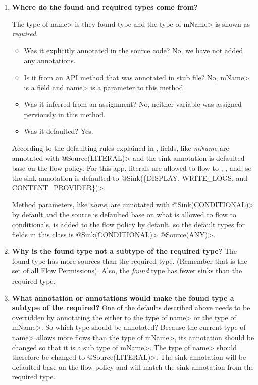 \begin{enumerate}

\item \textbf{Where do the found  and required types come from?}

The type of \<name> is they found type and the type of \<mName> is
shown as \emph{required}.  

 \begin{itemize}
    \item Was it explicitly annotated in the source code? No, we have not added 
    any annotations.
    \item Is it from an API method that was annotated in stub file? No, \<mName> 
    is a field and \<name> is a parameter to this method.
    \item Was it inferred from an assignment? No, neither variable was assigned 
    perviously in this method. 
    \item Was it defaulted? Yes.
    \end{itemize}

 According to the defaulting rules explained in , fields, like \emph{mName} 
 are annotated with \<@Source(LITERAL)> and the sink annotation is defaulted base on the  
 flow policy.  For this app, literals are allowed to flow to , 
 , and, so the sink annotation is 
 defaulted to \<@Sink(\{DISPLAY, WRITE\_LOGS, and CONTENT\_PROVIDER\})>.
 
 Method parameters, like \emph{name}, are annotated with \<@Sink(CONDITIONAL)> by 
 default and the source is defaulted base on what is allowed to flow to conditionals.
    is added to the flow policy by default, so the default types
    for fields in this class is \<@Sink(CONDITIONAL)> \<@Source(ANY)>.

 
 \item\textbf{ Why is the found type not a subtype of the required type?}
The found type has more sources than the required type. (Remember that 
is the set of all Flow Permissions). Also, the \emph{found} type has fewer sinks 
than the required type.

\item\textbf{What annotation or annotations would make the found type a subtype of the required?}
One of the defaults described above needs to be overridden by annotating the 
 either to the type of \<name> or the type of \<mName>. So which type should be 
 annotated? Because the current type of \<name> allows more flows than the type
 of \<mName>, its annotation should be changed so that it is a sub type of \<mName>.
  The type of \<name> should therefore be changed to \<@Source(LITERAL)>. The 
  sink annotation will be defaulted base on the flow policy and will match the 
  sink annotation from the required type.


\end{enumerate}
